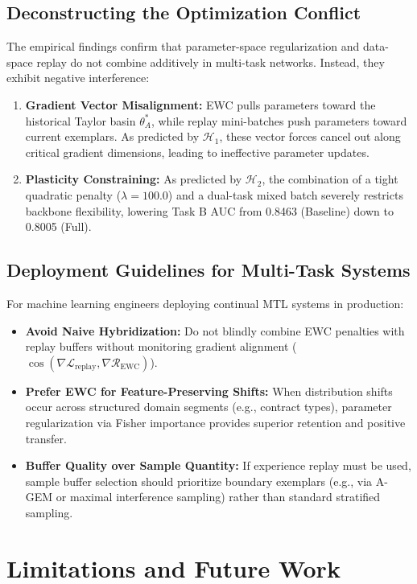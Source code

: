 \documentclass{article}
\begin{document}
\subsection{Deconstructing the Optimization Conflict}
The empirical findings confirm that parameter-space regularization and data-space replay do not combine additively in multi-task networks. Instead, they exhibit negative interference:
\begin{enumerate}
    \item \textbf{Gradient Vector Misalignment:} EWC pulls parameters toward the historical Taylor basin $\theta_A^*$, while replay mini-batches push parameters toward current exemplars. As predicted by $\mathcal{H}_1$, these vector forces cancel out along critical gradient dimensions, leading to ineffective parameter updates.
    \item \textbf{Plasticity Constraining:} As predicted by $\mathcal{H}_2$, the combination of a tight quadratic penalty ($\lambda=100.0$) and a dual-task mixed batch severely restricts backbone flexibility, lowering Task B AUC from 0.8463 (Baseline) down to 0.8005 (Full).
\end{enumerate}

\subsection{Deployment Guidelines for Multi-Task Systems}
For machine learning engineers deploying continual MTL systems in production:
\begin{itemize}
    \item \textbf{Avoid Naive Hybridization:} Do not blindly combine EWC penalties with replay buffers without monitoring gradient alignment ($\cos(\nabla \mathcal{L}_{\text{replay}}, \nabla \mathcal{R}_{\text{EWC}})$).
    \item \textbf{Prefer EWC for Feature-Preserving Shifts:} When distribution shifts occur across structured domain segments (e.g., contract types), parameter regularization via Fisher importance provides superior retention and positive transfer.
    \item \textbf{Buffer Quality over Sample Quantity:} If experience replay must be used, sample buffer selection should prioritize boundary exemplars (e.g., via A-GEM or maximal interference sampling) rather than standard stratified sampling.
\end{itemize}

\section{Limitations and Future Work}
\end{document}
